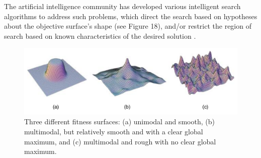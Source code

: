 \documentclass[12pt]{report} 	%
\numberwithin{figure}{chapter}
\numberwithin{table}{chapter}
\numberwithin{equation}{chapter}
\begin{document}
\begin{flushleft}
The artificial intelligence community has developed various intelligent search algorithms to address such problems, which direct the search based on hypotheses about the objective surface's shape (see Figure 18), and/or restrict the region of search based on known characteristics of the desired solution \cite[p. 64-108]{Russell:2009ai}.
\begin{figure}[h!]
\begin{center}
\includegraphics[scale=0.6]{DifferentTopologies}
\caption[Fitness surface topologies]{Three different fitness surfaces: (a) unimodal and smooth, (b) multimodal, but relatively smooth and with a clear global maximum, and (c) multimodal and rough with no clear global maximum.}
\end{center}
\end{figure}


\end{flushleft}
\end{document}
